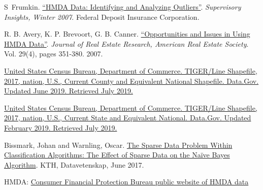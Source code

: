 \documentclass[conference,compsoc]{IEEEtran}
\begin{document}
\begin{thebibliography}{1}

S~Frumkin. \href{https://www.fdic.gov/regulations/examinations/supervisory/insights/siwin07/siwinter07-article4.pdf}{``HMDA Data: Identifying and Analyzing Outliers''}. \textit{Supervisory Insights, Winter 2007}.  Federal Deposit Insurance Corporation. 


R. B. Avery, K. P. Brevoort, G. B. Canner. \href{https://ideas.repec.org/a/jre/issued/v29n42007p351-380.html
}{``Opportunities and Issues in Using HMDA Data''}. \textit{Journal of Real Estate Research, American Real Estate Society}. Vol. 29(4), pages 351-380. 2007.

\href{ https://catalog.data.gov/dataset/tiger-line-shapefile-2017-nation-u-s-current-county-and-equivalent-national-shapefile}{United States Census Bureau, Department of Commerce. TIGER/Line Shapefile, 2017, nation, U.S., Current County and Equivalent National Shapefile. Data.Gov. Updated June 2019. Retrieved July 2019.}

\href{https://catalog.data.gov/dataset/tiger-line-shapefile-2017-nation-u-s-current-state-and-equivalent-national  }{United States Census Bureau, Department of Commerce. TIGER/Line Shapefile, 2017, nation, U.S., Current State and Equivalent National. Data.Gov. Updated February 2019. Retrieved July 2019. }


Bissmark, Johan and Warnling, Oscar. \href{http://www.diva-portal.se/smash/get/diva2:1111045/FULLTEXT01.pdf}{The Sparse Data Problem Within Classification Algorithms: The Effect of Sparse Data on the Naïve Bayes Algorithm}. KTH, Datavetenskap, June 2017.


HMDA: \href{https://www.consumerfinance.gov/data-research/hmda/historic-data/}{Consumer Financial Protection Bureau public website of HMDA data}


\end{thebibliography}




\end{document}
